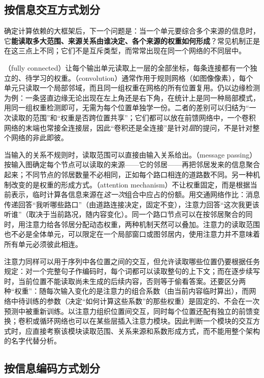 \subsection{按信息交互方式划分}
\label{sec:neural-types-interaction}

确定计算依赖的大框架后，下一个问题是：当一个单元要综合多个来源的信息时，它\textbf{能读取多大范围、来源关系由谁决定、各个来源的权重如何形成}？常见机制正是在这三点上不同；它们不是互斥类型，而常常出现在同一个网络的不同层中。

（fully connected）让每个输出单元读取上一层的全部坐标，每条连接都有一个独立的、待学习的权重。（convolution）通常作用于规则网格（如图像像素），每个单元只读取一个局部邻域，而且同一组权重在网格的所有位置复用。仍以边缘检测为例：一条竖直边缘无论出现在左上角还是右下角，在统计上是同一种局部模式，用同一组权重检测即可，无需为每个位置单独学一份。二者的差别可以归结为“一次读取的范围”和“权重是否跨位置共享”；它们都可以放在前馈网络中，一个卷积网络的末端也常接全连接层，因此“卷积还是全连接”是针对\emph{层}的提问，不是针对整个网络的非此即彼。

当输入的关系不规则时，读取范围可以直接由输入关系给出。（message passing）按输入图确定每个节点可以读取的来源——它的邻居——再把邻居发来的信息聚合起来；不同节点的邻居数量不必相同，正如每个路口相连的道路数不同。另一种机制改变的是权重的形成方式。（attention mechanism）不让权重固定，而是根据当前表示，临时计算各信息来源在\emph{这一次}组合中应占的份额。用交通网络作比：消息传递回答“我听哪些路口”（由道路连接决定，固定不变），注意力回答“这次我更该听谁”（取决于当前路况，随内容变化）。同一个路口节点可以在按邻居聚合的同时，用注意力给各邻居分配动态权重，两种机制天然可以叠加。注意力的读取范围也不必是全体单元，可以限定在一个局部窗口或图邻居内，使用注意力并不意味着所有单元必须彼此相连。

注意力同样可以用于序列中各位置之间的交互，但允许读取哪些位置仍要根据任务规定：对一个完整句子作编码时，每个词都可以读取整句的上下文；而在逐步续写时，当前位置不能读取尚未生成的后续内容，否则等于偷看答案。还要区分两种“权重”：随每次输入变化的是注意力的组合系数（由当前内容临时算出），而网络中待训练的参数（决定“如何计算这些系数”的那些权重）是固定的、不会在一次预测中被重新训练。以注意力组织位置间交互，同时每个位置还配有独立的前馈变换；卷积或循环网络也可以在某些层插入注意力模块。因此判断一个模块的交互方式时，应直接考察该模块读取范围、关系来源和系数形成方式，而不能用整个架构的名字代替分析。

\subsection{按信息编码方式划分}
\label{sec:neural-types-encoding}

